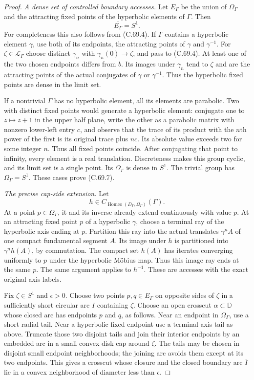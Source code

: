 \begin{proof}
\emph{A dense set of controlled boundary accesses.}
Let $E_\Gamma$ be the union of
$\Omega_\Gamma$ and the attracting fixed
points of the hyperbolic elements of
$\Gamma$. Then
\[
                          \overline{E_\Gamma}=S^1.
                                                               \tag{C.69.7}
\]
For completeness this also follows from
(C.69.4). If $\Gamma$ contains a
hyperbolic element $\gamma$, use both
of its endpoints, the attracting
points of $\gamma$ and $\gamma^{-1}$.
For $\zeta\in\mathcal L_\Gamma$ choose
distinct $\gamma_n$ with
$\gamma_n(0)\to\zeta$, and pass to
(C.69.4). At least one of the two
chosen endpoints differs from $b$.
Its images under $\gamma_n$ tend to
$\zeta$ and are the attracting points
of the actual conjugates of $\gamma$
or $\gamma^{-1}$.
Thus the hyperbolic fixed points are
dense in the limit set.

If a nontrivial $\Gamma$ has no
hyperbolic element, all its elements
are parabolic. Two with distinct fixed
points would generate a hyperbolic
element: conjugate one to $z\mapsto z+1$
in the upper half plane, write the
other as a parabolic matrix with
nonzero lower-left entry $c$, and
observe that the trace of its product
with the $n$th power of the first
is its original trace plus $nc$.
Its absolute value exceeds two for
some integer $n$.
Thus all fixed points coincide.
After conjugating that point to
infinity, every element is a real
translation. Discreteness makes
this group cyclic, and its limit
set is a single point.
Its $\Omega_\Gamma$ is dense in
$S^1$. The trivial group has
$\Omega_\Gamma=S^1$.
These cases prove (C.69.7).

\emph{The precise cap-side extension.}
Let
\[
             h\in
 C_{\operatorname{Homeo}(D_\Gamma,\Omega_\Gamma)}(\Gamma).
                                                               \tag{C.69.8}
\]
At a point $p\in\Omega_\Gamma$, it and
its inverse already extend continuously
with value $p$.
At an attracting fixed point $p$ of a
hyperbolic $\gamma$, choose a terminal
ray of the hyperbolic axis ending at $p$.
Partition this ray into the actual
translates $\gamma^n A$ of one compact
fundamental segment $A$.
Its image under $h$ is partitioned
into $\gamma^n h(A)$, by commutation.
The compact set $h(A)$ has iterates
converging uniformly to $p$ under
the hyperbolic M\"obius map.
Thus this image ray ends at the
same $p$. The same argument applies
to $h^{-1}$. These are accesses
with the exact original axis labels.

Fix $\zeta\in S^1$ and $\epsilon>0$.
Choose two points $p,q\in E_\Gamma$
on opposite sides of $\zeta$ in
a sufficiently short circular arc
$I$ containing $\zeta$. Choose an
open crosscut $\alpha\subset\mathbb D$
whose closed arc has endpoints
$p$ and $q$, as follows. Near an
endpoint in $\Omega_\Gamma$, use
a short radial tail. Near a
hyperbolic fixed endpoint use
a terminal axis tail as above.
Truncate those two disjoint tails
and join their interior endpoints
by an embedded arc in a small
convex disk cap around $\zeta$.
The tails may be chosen in
disjoint small endpoint neighborhoods;
the joining arc avoids them except
at its two endpoints.
This gives a crosscut whose closure
and the closed boundary arc
$\overline I$ lie in a convex
neighborhood of diameter less than
$\epsilon$.


\end{proof}
